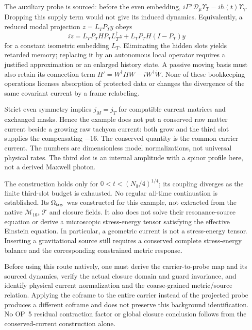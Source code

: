 \begin{remark}
\label{rem:projected-current-model-status}
The auxiliary probe is sourced: before the even embedding,
$i\Gamma^\mu\mathcal D_\mu\Upsilon_T=ih(t)\Upsilon_\gamma$.
Dropping this supply term would not give its induced dynamics.
Equivalently, a reduced modal projection $z=L_TP_Ty$ obeys
\[
  i\dot z=L_TP_THP_TL_T^\dagger z
  +L_TP_TH(I-P_T)y
\]
for a constant isometric embedding $L_T$. Eliminating the hidden
slots yields retarded memory; replacing it by an autonomous local
operator requires a justified approximation or an enlarged history
state. A passive moving basis must also retain its connection term
$H'=W^\dagger HW-iW^\dagger\dot W$. None of these bookkeeping
operations licenses absorption of protected data or changes the
divergence of the same covariant current by a frame relabeling.

Strict even symmetry implies $j_M=j_T$ for compatible current
matrices and exchanged masks. Hence the example does not put a
conserved raw matter current beside a growing raw tachyon current:
both grow and the third slot supplies the compensating $-16$.
The conserved quantity is the common carrier current. The numbers
are dimensionless model normalizations, not universal physical rates.
The third slot is an internal amplitude with a spinor profile here,
not a derived Maxwell photon.

The construction holds only for $0<t<(N_0/4)^{1/4}$; its coupling
diverges as the finite third-slot budget is exhausted. No regular
all-time continuation is established. Its $\Omega_{\rm toy}$ was
constructed for this example, not extracted from the native
$\mathcal M_{16}$, $\mathcal T$ and closure fields. It also does not
solve their resonance-source equation or derive a microscopic
stress-energy tensor satisfying the effective Einstein equation.
In particular, a geometric current is not a stress-energy tensor.
Inserting a gravitational source still requires a conserved complete
stress-energy balance and the corresponding constrained metric response.

Before using this route natively, one must derive the carrier-to-probe
map and its sourced dynamics, verify the actual closure domain and
guard invariance, and identify physical current normalization and the
coarse-grained metric/source relation. Applying the coframe to the
entire carrier instead of the projected probe produces a different
coframe and does not preserve this background identification.
No OP~5 residual contraction factor or global closure conclusion
follows from the conserved-current construction alone.
\end{remark}

